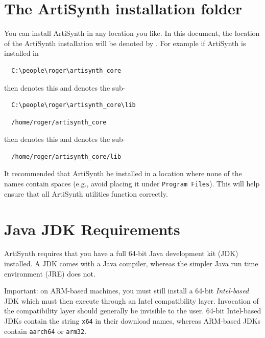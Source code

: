 \section{The ArtiSynth installation folder}
\label{FileConventions}

You can install ArtiSynth in any location you like.
In this document, the location of the ArtiSynth installation \directory{}
will be denoted by \ArtHome[]. For example
if ArtiSynth is installed in
\ifWindows
\begin{verbatim}
  C:\people\roger\artisynth_core
\end{verbatim}
then \ArtHome[] denotes this \directory{}
and  denotes the sub-\directory{}
\begin{verbatim}
  C:\people\roger\artisynth_core\lib
\end{verbatim}
\else %
\begin{verbatim}
  /home/roger/artisynth_core
\end{verbatim}
then \ArtHome[] denotes this \directory{}
and  denotes the sub-\directory{}
\begin{verbatim}
  /home/roger/artisynth_core/lib
\end{verbatim}
\fi %

\ifLinux\else %
\begin{sideblock}
It recommended that ArtiSynth be installed in a location where none of
the \directory{} names contain spaces (e.g., avoid placing it under
{\tt Program Files}).  This will help ensure that all ArtiSynth
utilities function correctly.
\end{sideblock}
\fi %

\section{Java JDK Requirements}
\label{InstallingJava}

ArtiSynth requires that you have a full 64-bit Java development kit
(JDK) installed. A JDK comes with a Java compiler, whereas the simpler
Java run time environment (JRE) does not.

\begin{sideblock}
Important: on ARM-based machines, you must still install a 64-bit {\it
Intel-based} JDK which must then execute through an Intel
compatibility layer. Invocation of the compatibility layer should
generally be invisible to the user.  64-bit Intel-based JDKs
contain the string {\tt x64} in their download names, whereas
ARM-based JDKs contain {\tt aarch64} or {\tt arm32}.
\end{sideblock}


